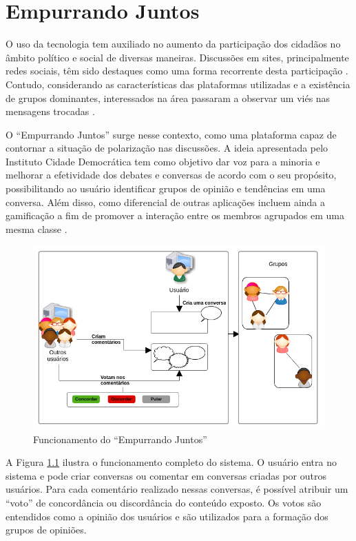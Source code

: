 \chapter{Empurrando Juntos} \label{cap:empurrandojuntos}

O uso da tecnologia tem auxiliado no aumento da participação dos 
cidadãos no âmbito político e social de diversas maneiras. Discussões em sites, principalmente redes sociais, têm sido
destaques como uma forma recorrente desta participação \cite{marques2008participaccao}.
Contudo, considerando as características das plataformas utilizadas e a existência de grupos dominantes, interessados
na área passaram a observar um viés nas mensagens trocadas \cite{empurrandojuntos, marques2008participaccao}. 

O ``Empurrando Juntos'' surge nesse contexto, como uma plataforma capaz de contornar a situação de polarização nas discussões.
A ideia apresentada pelo Instituto Cidade Democrática tem como objetivo dar voz para a minoria e 
melhorar a efetividade dos debates e conversas de acordo com o seu propósito, possibilitando ao usuário
identificar grupos de opinião e tendências em uma conversa. Além disso, como diferencial de outras aplicações
incluem ainda a gamificação a fim de promover a interação entre os membros agrupados em uma mesma classe 
\cite{empurrandojuntos}. 

\begin{figure}[h!]
\centering
\includegraphics[scale=0.7]{figuras/resumo_ej.png}
\caption{Funcionamento do ``Empurrando Juntos''}
\label{fig:resumo_ej}
\end{figure}

A Figura \ref{fig:resumo_ej} ilustra o funcionamento completo do sistema. O usuário entra no sistema e pode criar conversas ou
comentar em conversas criadas por outros usuários. Para cada comentário realizado nessas conversas, é possível atribuir um 
``voto'' de concordância ou discordância do conteúdo exposto. Os votos são entendidos como a opinião dos usuários e são
utilizados para a formação dos grupos de opiniões. 

